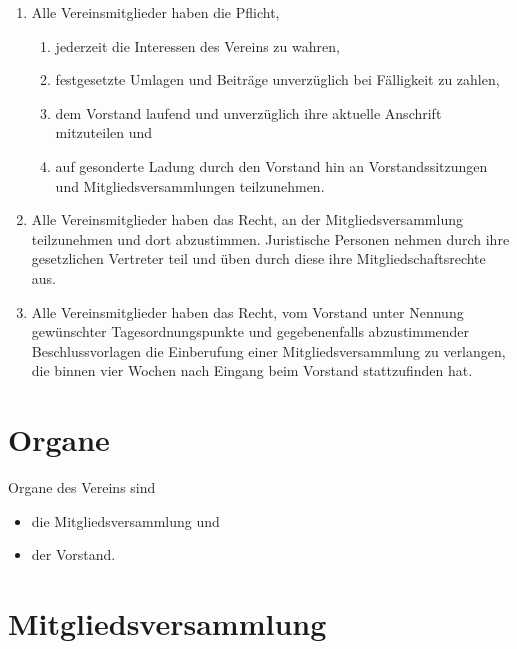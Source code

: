 \documentclass[a4paper, 10pt, headings=normal]{scrartcl}
\begin{document}
\begin{multicols}{2}
\begin{enumerate}[label={(\arabic*)}]
	\item
		Alle Vereinsmitglieder haben die Pflicht,
		\begin{enumerate}[label={\arabic*.}]
			\item
				jederzeit die Interessen des Vereins zu wahren,
			\item
				festgesetzte Umlagen und Beiträge unverzüglich bei Fälligkeit zu zahlen,
			\item
				dem Vorstand laufend und unverzüglich ihre aktuelle Anschrift mitzuteilen und
			\item
				auf gesonderte Ladung durch den Vorstand hin an Vorstandssitzungen und Mitgliedsversammlungen teilzunehmen.
		\end{enumerate}
	\item
		Alle Vereinsmitglieder haben das Recht, an der Mitgliedsversammlung teilzunehmen und dort abzustimmen.
		Juristische Personen nehmen durch ihre gesetzlichen Vertreter teil und üben durch diese ihre Mitgliedschaftsrechte aus.
	\item
		Alle Vereinsmitglieder haben das Recht, vom Vorstand unter Nennung gewünschter Tagesordnungspunkte und gegebenenfalls abzustimmender Beschlussvorlagen die Einberufung einer Mitgliedsversammlung zu verlangen, die binnen vier Wochen nach Eingang beim Vorstand stattzufinden hat.
\end{enumerate}

\section{Organe}
\label{par:organe}

Organe des Vereins sind
\begin{itemize}[label={–}]
	\item
		die Mitgliedsversammlung und
	\item
		der Vorstand.
\end{itemize}

\section{Mitgliedsversammlung}
\label{par:mitgliederversammlung}


\end{multicols}
\end{document}
